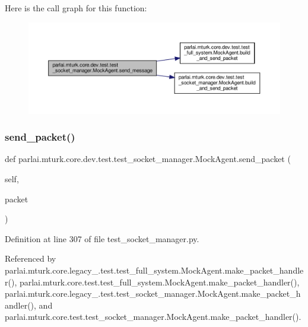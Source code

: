 Here is the call graph for this function\+:
\nopagebreak
\begin{figure}[H]
\begin{center}
\leavevmode
\includegraphics[width=350pt]{classparlai_1_1mturk_1_1core_1_1dev_1_1test_1_1test__socket__manager_1_1MockAgent_a0e22c9a64a4c8cefe48c673c16917ba8_cgraph}
\end{center}
\end{figure}
\mbox{\label{classparlai_1_1mturk_1_1core_1_1dev_1_1test_1_1test__socket__manager_1_1MockAgent_a5f06298a6f48e04c3b5fc3412232f0dc}} 
\subsubsection{\texorpdfstring{send\+\_\+packet()}{send\_packet()}}
{\footnotesize\ttfamily def parlai.\+mturk.\+core.\+dev.\+test.\+test\+\_\+socket\+\_\+manager.\+Mock\+Agent.\+send\+\_\+packet (\begin{DoxyParamCaption}\item[{}]{self,  }\item[{}]{packet }\end{DoxyParamCaption})}



Definition at line 307 of file test\+\_\+socket\+\_\+manager.\+py.



Referenced by parlai.\+mturk.\+core.\+legacy\+\_.\+test.\+test\+\_\+full\+\_\+system.\+Mock\+Agent.\+make\+\_\+packet\+\_\+handler(), parlai.\+mturk.\+core.\+test.\+test\+\_\+full\+\_\+system.\+Mock\+Agent.\+make\+\_\+packet\+\_\+handler(), parlai.\+mturk.\+core.\+legacy\+\_.\+test.\+test\+\_\+socket\+\_\+manager.\+Mock\+Agent.\+make\+\_\+packet\+\_\+handler(), and parlai.\+mturk.\+core.\+test.\+test\+\_\+socket\+\_\+manager.\+Mock\+Agent.\+make\+\_\+packet\+\_\+handler().

